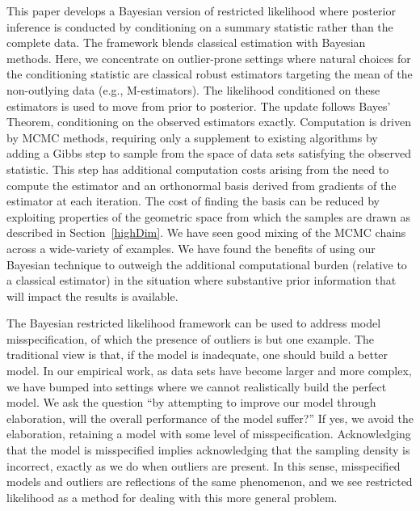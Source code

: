 \documentclass[ba]{imsart}
\newcommand{\response}[1]{{\color{blue}#1}}
\begin{document}
This paper develops a Bayesian version of restricted likelihood where posterior inference is conducted by conditioning on a summary statistic rather than the complete data.  The framework blends classical estimation with Bayesian methods.  
Here, we concentrate on outlier-prone settings where natural choices for the conditioning statistic are classical robust estimators targeting the mean of the non-outlying data (e.g., M-estimators).  The likelihood conditioned on these estimators is used to move from prior to posterior. The update follows Bayes' Theorem, conditioning on the observed estimators exactly.   Computation is driven by MCMC methods, requiring only a supplement to existing algorithms by adding a Gibbs step to sample from the space of data sets satisfying the observed statistic. This step has additional computation costs arising from the need to compute the estimator and an orthonormal basis derived from gradients of the estimator at each iteration. The cost of finding the basis can be reduced by exploiting properties of the geometric space from which the samples are drawn as described in Section~\ref{highDim}. We have seen good mixing of the MCMC chains across a wide-variety of examples. %
We have found the benefits of using our Bayesian technique to outweigh the additional computational burden (relative to a classical estimator) in the situation where substantive prior information that will impact the results is available.
 
The Bayesian restricted likelihood framework can be used to address model misspecification, of which the presence of outliers is but one example. The traditional view is that, if the model is inadequate, one should build a better model. In our empirical work, as data sets have become larger and more complex, we have bumped into settings where we cannot realistically build the perfect model. We ask the question ``by attempting to improve our model through elaboration, will the overall performance of the model suffer?'' If yes, we avoid the elaboration, retaining a model with some level of misspecification. Acknowledging that the model is misspecified implies acknowledging that the sampling density is incorrect, exactly as we do when outliers are present. In this sense, misspecified models and outliers are reflections of the same phenomenon, and we see restricted likelihood as a method for dealing with this more general problem. 
\end{document}
